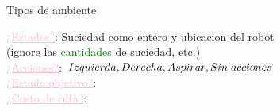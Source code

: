 
    \begin{frame}{Tipos de ambiente}
        \small{
            \textcolor{Pink}{\underline{¿Estados?}}: Suciedad como entero y ubicacion del robot \\          \hspace{1.8cm} (ignore las \textcolor{Green}{cantidades} de suciedad, etc.) \\
            \textcolor{Pink}{\underline{¿Acciones?}}: \textcolor{Purple}{$Izquierda, Derecha, Aspirar, %
            Sin \hspace{0.1cm}acciones$} \\
            \textcolor{Pink}{\underline{¿Estado objetivo?}}: \\
            \textcolor{Pink}{\underline{¿Costo de ruta?}}: 
        }
        \break\break\break\break\break
    \end{frame}
